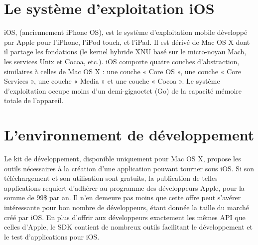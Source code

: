 \documentclass[a4paper,12pt]{report}
\begin{document}
\begin{onehalfspace}
\section{Le système d'exploitation iOS}
iOS, (anciennement iPhone OS), est le système d'exploitation mobile développé par Apple pour l'iPhone, l'iPod touch, et l'iPad. Il est dérivé de Mac OS X dont il partage les fondations (le kernel hybride XNU basé sur le micro-noyau Mach, les services Unix et Cocoa, etc.). iOS comporte quatre couches d'abstraction, similaires à celles de Mac OS X : une couche « Core OS », une couche « Core Services », une couche « Media » et une couche « Cocoa ». Le système d'exploitation occupe moins d'un demi-gigaoctet (Go) de la capacité mémoire totale de l'appareil.

\section{L'environnement de développement}
Le kit de développement, disponible uniquement pour Mac OS X, propose les outils nécessaires à la création d'une application pouvant tourner sous iOS. Si son téléchargement et son utilisation sont gratuits, la publication de telles applications requiert d'adhérer au programme des développeurs Apple, pour la somme de 99\$ par an. Il n'en demeure pas moins que cette offre peut s'avérer intéressante pour bon nombre de développeurs, étant donnée la taille du marché créé par iOS.
En plus d'offrir aux développeurs exactement les mêmes API que celles d'Apple, le SDK contient de nombreux outils facilitant le développement et le test d'applications pour iOS.


\end{onehalfspace}
\end{document}
